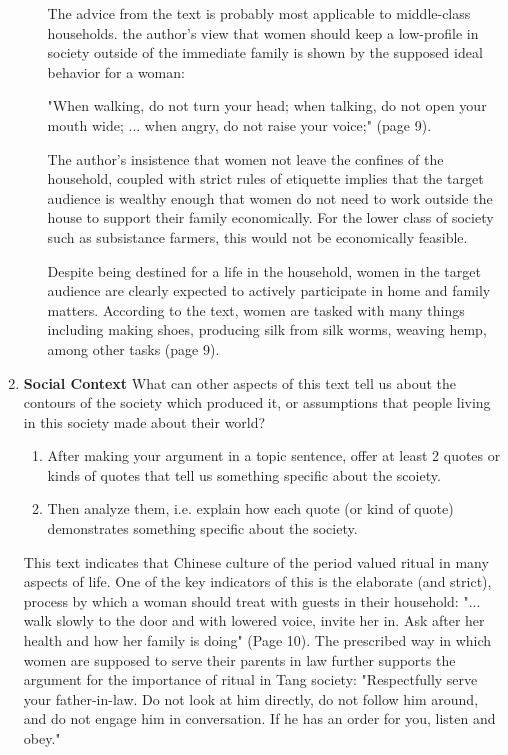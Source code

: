 \documentclass{article}
\begin{document}
\begin{enumerate}
\begin{enumerate}
        The advice from the text is probably most applicable to middle-class households.  the author's view that women should keep a low-profile in society outside of the immediate family is shown by the supposed ideal behavior for a woman:

        "When walking, do not turn your head; when talking, do not open your mouth wide; ... when angry, do not raise your voice;" (page 9).

        The author's insistence that women not leave the confines of the household, coupled with strict rules of etiquette implies that the target audience is wealthy enough that women do not need to work outside the house to support their family economically.  For the lower class of society such as subsistance farmers, this would not be economically feasible.

        Despite being destined for a life in the household, women in the target audience are clearly expected to actively participate in home and family matters.  According to the text, women are tasked with many things including making shoes, producing silk from silk worms, weaving hemp, among other tasks (page 9).
      \end{enumerate}
    \item \textbf{Social Context} What can other aspects of this text tell us about the contours of the society which produced it, or assumptions that people living in this society made about their world?
      \begin{enumerate}
      \item After making your argument in a topic sentence, offer at least 2 quotes or kinds of quotes that tell us something specific about the scoiety.
      \item Then analyze them, i.e. explain  how each quote (or kind of quote) demonstrates something specific about the society.
      \end{enumerate}

      This text indicates that Chinese culture of the period valued ritual in many aspects of life.  One of the key indicators of this is the elaborate (and strict), process by which a woman should treat with guests in their household: "... walk slowly to the door and with lowered voice, invite her in.  Ask after her health and how her family is doing" (Page 10).
      The prescribed way in which women are supposed to serve their parents in law further supports the argument for the importance of ritual in Tang society:  "Respectfully serve your father-in-law.  Do not look at him directly, do not follow him around, and do not engage him in conversation.  If he has an order for you, listen and obey."
  \end{enumerate}
\end{document}
